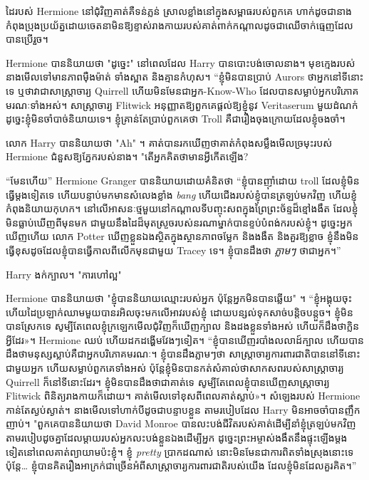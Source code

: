 ដៃរបស់ Hermione នៅជុំវិញគាត់គឺទន់ភ្លន់ ស្រាលខ្លាំងនៅក្នុងសម្ពាធរបស់ពួកគេ ហាក់ដូចជានាងកំពុងប្រុងប្រយ័ត្នដោយចេតនាមិនឱ្យខ្ទាស់រាងកាយរបស់គាត់ពាក់កណ្តាលដូចជាឈើចាក់ធ្មេញដែលបានប្រើរួច។

Hermione បាននិយាយថា "ដូច្នេះ" នៅពេលដែល Harry បានបោះបង់ចោលនាង។ មុខ​ក្មេង​របស់​នាង​មើល​ទៅ​មាន​ភាព​ម៉ឺងម៉ាត់ ទាំង​ស្អាត និង​គ្មាន​កំហុស។ “ខ្ញុំមិនបានប្រាប់ Aurors ថាអ្នកនៅទីនោះទេ ឬថាវាជាសាស្រ្តាចារ្យ Quirrell ហើយមិនមែនជាអ្នក-Know-Who ដែលបានសម្លាប់អ្នកបរិភោគមរណៈទាំងអស់។ សាស្រ្តាចារ្យ Flitwick អនុញ្ញាតឱ្យពួកគេផ្តល់ឱ្យខ្ញុំនូវ Veritaserum មួយដំណក់ ដូច្នេះខ្ញុំមិនចាំបាច់និយាយទេ។ ខ្ញុំគ្រាន់តែប្រាប់ពួកគេថា Troll គឺជារឿងចុងក្រោយដែលខ្ញុំចងចាំ។

លោក Harry បាននិយាយថា "Ah" ។ គាត់បានរកឃើញថាគាត់កំពុងសម្លឹងមើលច្រមុះរបស់ Hermione ជំនួសឱ្យភ្នែករបស់នាង។ "តើអ្នកគិតថាមានអ្វីកើតឡើង?

“មែនហើយ” Hermione Granger បាននិយាយដោយគំនិតថា “ខ្ញុំបានញ៉ាំដោយ troll ដែលខ្ញុំមិនធ្វើម្តងទៀតទេ ហើយបន្ទាប់មកមានសំលេងខ្លាំង \emph{bang} ហើយជើងរបស់ខ្ញុំបានត្រឡប់មកវិញ ហើយខ្ញុំកំពុងនិយាយកុហក។ នៅលើអាសនៈថ្មមួយនៅកណ្តាលទីបញ្ចុះសពក្នុងព្រៃព្រះច័ន្ទដ៏ខ្មៅងងឹត ដែលខ្ញុំមិនធ្លាប់ឃើញពីមុនមក ជាមួយនឹងដៃដ៏មុតស្រួចរបស់នរណាម្នាក់បានខ្ទប់បំពង់ករបស់ខ្ញុំ។ ដូច្នេះអ្នកឃើញហើយ លោក Potter ឃើញខ្លួនឯងស្ថិតក្នុងស្ថានភាពចម្លែក និងងងឹត និងគួរឱ្យខ្លាច ខ្ញុំនឹងមិនធ្វើខុសដូចដែលខ្ញុំបានធ្វើកាលពីលើកមុនជាមួយ Tracey ទេ។ ខ្ញុំបានដឹងថា \emph{ភ្លាមៗ} ថាជាអ្នក។”

Harry ងក់ក្បាល។ "ការហៅល្អ"

Hermione បាននិយាយថា "ខ្ញុំបាននិយាយឈ្មោះរបស់អ្នក ប៉ុន្តែអ្នកមិនបានឆ្លើយ" ។ “ខ្ញុំ​អង្គុយ​ចុះ ហើយ​ដៃ​ប្រឡាក់​ឈាម​មួយ​បាន​រអិល​ចុះ​មក​លើ​អាវ​របស់​ខ្ញុំ ដោយ​បន្សល់​ទុក​សាច់​បន្តិច​បន្តួច។ ខ្ញុំ​មិន​បាន​ស្រែក​ទេ សូម្បី​តែ​ពេល​ខ្ញុំ​ក្រឡេក​មើល​ជុំវិញ​ក៏​ឃើញ​ក្បាល និង​ដង​ខ្លួន​ទាំង​អស់ ហើយ​ក៏​ដឹង​ថា​ក្លិន​អ្វី​ដែរ»។ Hermione ឈប់ ហើយដកដង្ហើមវែងៗទៀត។ “ខ្ញុំ​បាន​ឃើញ​របាំង​លលាដ៍​ក្បាល ហើយ​បាន​ដឹង​ថា​មនុស្ស​ស្លាប់​គឺ​ជា​អ្នក​បរិភោគ​មរណៈ។ ខ្ញុំបានដឹងភ្លាមៗថា សាស្ត្រាចារ្យការពារជាតិបាននៅទីនោះជាមួយអ្នក ហើយសម្លាប់ពួកគេទាំងអស់ ប៉ុន្តែខ្ញុំមិនបានកត់សំគាល់ថាសាកសពរបស់សាស្រ្តាចារ្យ Quirrell ក៏នៅទីនោះដែរ។ ខ្ញុំ​មិន​បាន​ដឹង​ថា​ជា​គាត់​ទេ សូម្បី​តែ​ពេល​ខ្ញុំ​បាន​ឃើញ​សាស្ត្រាចារ្យ Flitwick ពិនិត្យ​រាងកាយ​ក៏​ដោយ។ គាត់​មើល​ទៅ​ខុស​ពី​ពេល​គាត់​ស្លាប់»។ សំឡេងរបស់ Hermione កាន់តែស្ងប់ស្ងាត់។ នាងមើលទៅហាក់បីដូចជាបន្ទាបខ្លួន តាមរបៀបដែល Harry មិនអាចចាំបានញឹកញាប់។ "ពួកគេបាននិយាយថា David Monroe បានលះបង់ជីវិតរបស់គាត់ដើម្បីនាំខ្ញុំត្រឡប់មកវិញតាមរបៀបដូចគ្នាដែលម្តាយរបស់អ្នកលះបង់ខ្លួនឯងដើម្បីអ្នក ដូច្នេះព្រះអម្ចាស់ងងឹតនឹងផ្ទុះឡើងម្តងទៀតនៅពេលគាត់ព្យាយាមប៉ះខ្ញុំ។ ខ្ញុំ \emph{pretty} ប្រាកដណាស់ នោះមិនមែនជាការពិតទាំងស្រុងនោះទេ ប៉ុន្តែ… ខ្ញុំបានគិតរឿងអាក្រក់ជាច្រើនអំពីសាស្រ្តាចារ្យការពារជាតិរបស់យើង ដែលខ្ញុំមិនដែលគួរគិត។”

